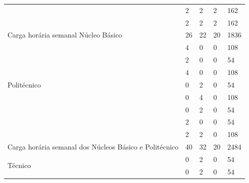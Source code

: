 \documentclass[11pt,fleqn]{book} %
\begin{document}
\begin{table}[H]
{\begin{tabular}{|l|l|l|l|l|l|}
			& \nameref{disc:filosofia}                                                     & 2          & 2         & 2         & 162       \\ \cline{2-6} 
			& \nameref{disc:sociologia}                                                    & 2          & 2         & 2         & 162       \\ \hline
			\multicolumn{2}{|l|}{Carga horária semanal Núcleo Básico}                      & 26         & 22        & 20        & 1836      \\ \hline
			\multirow{7}{*}{Politécnico}   
			& \nameref{disc:quimica}                                                       & 4          & 0         & 0         & 108       \\ \cline{2-6} 
			& \nameref{disc:quimica_organica}                                              & 2          & 0         & 0         & 54        \\ \cline{2-6}			
			& \nameref{disc:biologia}                                                      & 4          & 0         & 0         & 108       \\ \cline{2-6} 	
			& \nameref{disc:bioquimica}                                                    & 0          & 2         & 0         & 54        \\ \cline{2-6} 
			& \nameref{disc:biomol}                                                        & 0          & 4         & 0         & 108       \\ \cline{2-6} 
			& \nameref{disc:bioetica}                                                      & 0          & 2         & 0         & 54        \\ \cline{2-6} 		
			& \nameref{disc:bioseg}                                                        & 2          & 0         & 0         & 54        \\ \cline{2-6} 		
			& \nameref{disc:pratica}                                                       & 2          & 2         & 0         & 108       \\ \hline	
			\multicolumn{2}{|l|}{Carga horária semanal dos Núcleos Básico  e Politécnico}  & 40         & 32        & 20        & 2484      \\ \hline
			\multirow{7}{*}{Técnico}       
			& \nameref{disc:biotecAnimal}                                                  & 0          & 2         & 0         & 54        \\ \cline{2-6} 
			& \nameref{disc:biotecVegetal}                                                 & 0          & 2         & 0         & 54        \\ \cline{2-6} 

\end{tabular}}
\end{table}
\end{document}
